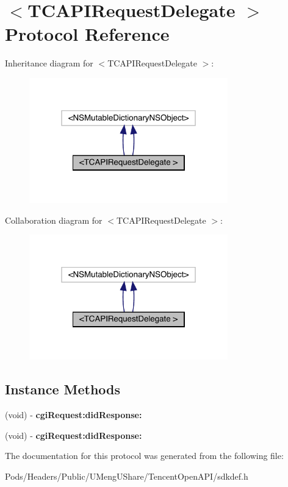 \hypertarget{protocol_t_c_a_p_i_request_delegate_01-p}{}\section{$<$T\+C\+A\+P\+I\+Request\+Delegate $>$ Protocol Reference}
\label{protocol_t_c_a_p_i_request_delegate_01-p}


Inheritance diagram for $<$T\+C\+A\+P\+I\+Request\+Delegate $>$\+:\nopagebreak
\begin{figure}[H]
\begin{center}
\leavevmode
\includegraphics[width=244pt]{protocol_t_c_a_p_i_request_delegate_01-p__inherit__graph}
\end{center}
\end{figure}


Collaboration diagram for $<$T\+C\+A\+P\+I\+Request\+Delegate $>$\+:\nopagebreak
\begin{figure}[H]
\begin{center}
\leavevmode
\includegraphics[width=244pt]{protocol_t_c_a_p_i_request_delegate_01-p__coll__graph}
\end{center}
\end{figure}
\subsection*{Instance Methods}
\begin{DoxyCompactItemize}
\item 
\mbox{\label{protocol_t_c_a_p_i_request_delegate_01-p_a2af86710c21495c4f4b039a2b5956671}} 
(void) -\/ {\bfseries cgi\+Request\+:did\+Response\+:}
\item 
\mbox{\label{protocol_t_c_a_p_i_request_delegate_01-p_a2af86710c21495c4f4b039a2b5956671}} 
(void) -\/ {\bfseries cgi\+Request\+:did\+Response\+:}
\end{DoxyCompactItemize}


The documentation for this protocol was generated from the following file\+:\begin{DoxyCompactItemize}
\item 
Pods/\+Headers/\+Public/\+U\+Meng\+U\+Share/\+Tencent\+Open\+A\+P\+I/sdkdef.\+h\end{DoxyCompactItemize}
